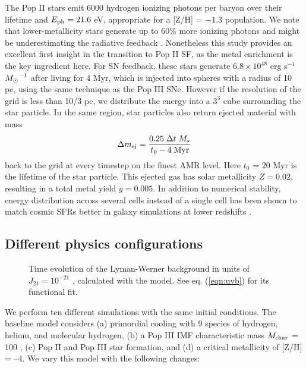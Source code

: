 \documentclass[useAMS,usenatbib]{mn2e}
\begin{document}
The Pop II stars emit 6000 hydrogen ionizing photons per baryon over
their lifetime and $E_{\rm ph} = 21.6$ eV, appropriate for a [Z/H] =
$-1.3$ population.  We note that lower-metallicity stars generate up
to 60\% more ionizing photons and might be underestimating the
radiative feedback \citep{Schaerer03}.  Nonetheless this study
provides an excellent first insight in the transition to Pop II SF, as
the metal enrichment is the key ingredient here.  For SN feedback,
these stars generate $6.8 \times 10^{48}$ erg s$^{-1}$ $\Ms^{-1}$
after living for 4 Myr, which is injected into spheres with a radius
of 10 pc, using the same technique as the Pop III SNe.  However if the
resolution of the grid is less than 10/3 pc, we distribute the energy
into a $3^3$ cube surrounding the star particle.  In the same region,
star particles also return ejected material with mass
%
\begin{equation}
  \label{eqn:SNmass}
  \Delta m_{\rm ej} = \frac{0.25 \; \Delta t \; M_\star} 
         {t_0 - 4\;\mathrm{Myr}}
\end{equation}
back to the grid at every timestep on the finest AMR level.  Here
$t_0$ = 20 Myr is the lifetime of the star particle.  This ejected gas
has solar metallicity $Z = 0.02$, resulting in a total metal yield $y
= 0.005$.  In addition to numerical stability, energy distribution
across several cells instead of a single cell has been shown to match
cosmic SFRs better in galaxy simulations at lower redshifts
\citep{Smith10}.

\subsection{Different physics configurations}
\label{sec:config}

\begin{figure}
  \caption{\label{fig:uvb} Time evolution of the Lyman-Werner
    background in units of $J_{21} = 10^{-21}$ \emis, calculated with
    the \citet{Wise05} model.  See eq. (\ref{eqn:uvb}) for its
    functional fit.}
\end{figure}

We perform ten different simulations with the same initial conditions.
The baseline model considers (a) primordial cooling with 9 species of
hydrogen, helium, and molecular hydrogen, (b) a Pop III IMF
characteristic mass $M_{\rm char}$ = 100 \Ms, (c) Pop II and Pop III
star formation, and (d) a critical metallicity of [Z/H] = --4.  We
vary this model with the following changes:
\end{document}
